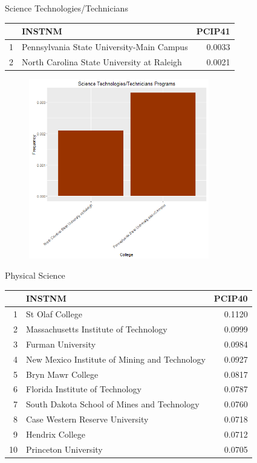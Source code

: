 \documentclass{article}
\begin{document}
Science Technologies/Technicians
\begin{table}[ht]
\centering
\begin{tabular}{rlr}
  \hline
 & INSTNM & PCIP41 \\ 
  \hline
1 & Pennsylvania State University-Main Campus & 0.0033 \\ 
  2 & North Carolina State University at Raleigh & 0.0021 \\ 
   \hline
\end{tabular}
\end{table}
\begin{figure}[H]
\includegraphics[width=0.7\textwidth]{../images/biggestTechnicians.png}
\end{figure}

\clearpage

Physical Science 
\begin{table}[ht]
\centering
\begin{tabular}{rlr}
  \hline
 & INSTNM & PCIP40 \\ 
  \hline
1 & St Olaf College & 0.1120 \\ 
  2 & Massachusetts Institute of Technology & 0.0999 \\ 
  3 & Furman University & 0.0984 \\ 
  4 & New Mexico Institute of Mining and Technology & 0.0927 \\ 
  5 & Bryn Mawr College & 0.0817 \\ 
  6 & Florida Institute of Technology & 0.0787 \\ 
  7 & South Dakota School of Mines and Technology & 0.0760 \\ 
  8 & Case Western Reserve University & 0.0718 \\ 
  9 & Hendrix College & 0.0712 \\ 
  10 & Princeton University & 0.0705 \\ 
   \hline
\end{tabular}
\end{table}
\end{document}
